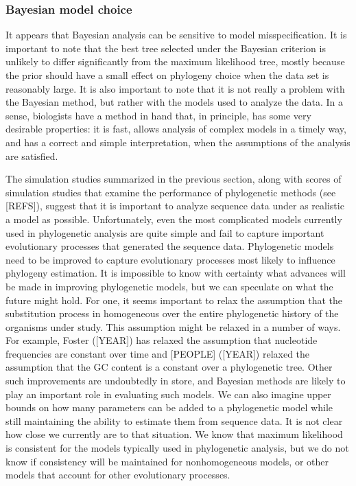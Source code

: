 \documentclass{svmult}
\begin{document}
\subsubsection{Bayesian model choice}


It appears that Bayesian analysis can be sensitive to model misspecification. It is important to
note that the best tree selected under the Bayesian criterion is unlikely to differ significantly
from the maximum likelihood tree, mostly because the prior should have a small effect on phylogeny
choice when the data set is reasonably large. It is also important to note that it is not really a
problem with the Bayesian method, but rather with the models used to analyze the data. In a sense,
biologists have a method in hand that, in principle, has some very desirable properties: it is
fast, allows analysis of complex models in a timely way, and has a correct and simple
interpretation, when the assumptions of the analysis are satisfied. 

The simulation studies summarized in the previous section, along with scores of simulation studies
that examine the performance of phylogenetic methods (see [REFS]), suggest that it is important to
analyze sequence data under as realistic a model as possible. Unfortunately, even the most
complicated models currently used in phylogenetic analysis are quite simple and fail to capture
important evolutionary processes that generated the sequence data. Phylogenetic models need to be
improved to capture evolutionary processes most likely to influence phylogeny estimation. It is
impossible to know with certainty what advances will be made in improving phylogenetic models, but
we can speculate on what the future might hold. For one, it seems important to relax the assumption
that the substitution process in homogeneous over the entire phylogenetic history of the organisms
under study. This assumption might be relaxed in a number of ways. For example, Foster ([YEAR]) has
relaxed the assumption that nucleotide frequencies are constant over time and [PEOPLE] ([YEAR])
relaxed the assumption that the GC content is a constant over a phylogenetic tree. Other such
improvements are undoubtedly in store, and Bayesian methods are likely to play an important role in
evaluating such models.  We can also imagine upper bounds on how many parameters can be added to a
phylogenetic model while still maintaining the ability to estimate them from sequence data. It is
not clear how close we currently are to that situation. We know that maximum likelihood is
consistent for the models typically used in phylogenetic analysis, but we do not know if
consistency will be maintained for nonhomogeneous models, or other models that account for other
evolutionary processes.
\end{document}
